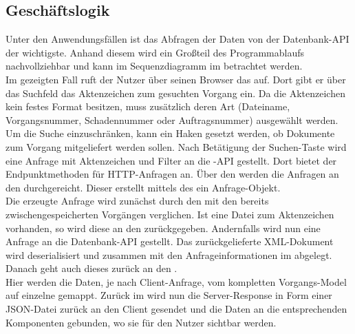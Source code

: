 \subsection{Geschäftslogik}
\label{sec:Geschaeftslogik}
Unter den Anwendungsfällen ist das Abfragen der Daten von der Datenbank-\acs{API} der wichtigste.
Anhand diesem wird ein Großteil des Programmablaufs nachvollziehbar und kann im Sequenzdiagramm
im  betrachtet werden.\\
Im gezeigten Fall ruft der Nutzer über seinen Browser das  auf.
Dort gibt er über das Suchfeld das Aktenzeichen zum gesuchten Vorgang ein. Da die Aktenzeichen kein festes 
Format besitzen, muss zusätzlich deren Art (Dateiname, Vorgangsnummer, Schadennummer oder Auftragsnummer)
ausgewählt werden. Um die Suche einzuschränken, kann ein Haken gesetzt werden, ob Dokumente zum Vorgang mitgeliefert werden sollen.
Nach Betätigung der Suchen-Taste wird eine Anfrage mit Aktenzeichen und Filter an die 
-\acs{API} gestellt. Dort bietet der  Endpunktmethoden für \acs{HTTP}-Anfragen an.
Über den  werden die Anfragen an den  durchgereicht.
Dieser erstellt mittels des  ein Anfrage-Objekt.\\
Die erzeugte Anfrage wird zunächst durch den  mit den bereits zwischengespeicherten
Vorgängen verglichen. Ist eine Datei zum Aktenzeichen vorhanden, so wird diese an den  
zurückgegeben. Andernfalls wird nun eine Anfrage an die Datenbank-API gestellt.
Das zurückgelieferte XML-Dokument wird deserialisiert und zusammen mit den Anfrageinformationen im  abgelegt.
Danach geht auch dieses zurück an den .\\
Hier werden die Daten, je nach Client-Anfrage, vom kompletten Vorgangs-Model auf einzelne  gemappt.
Zurück im  wird nun die Server-Response in Form einer \acs{JSON}-Datei zurück an den Client gesendet und die Daten
an die entsprechenden Komponenten gebunden, wo sie für den Nutzer sichtbar werden.

